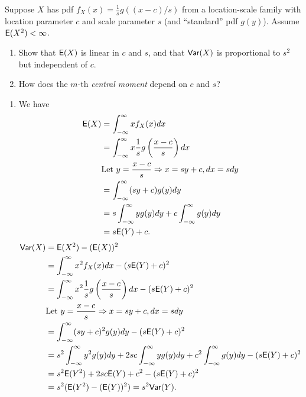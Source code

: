 \documentclass[12pt]{article}
\newcommand{\E}{{\sf E}}
\newcommand{\Var}{{\sf Var}}
\newenvironment{problem}[2][Problem]{\begin{trivlist}
\item[\hskip \labelsep {\bfseries #1}\hskip \labelsep {\bfseries #2.}]}
{\end{trivlist}}
\begin{document}
\begin{problem}{5}
  Suppose $X$ has pdf $f_X(x) = \frac1s g((x-c)/s)$ from a location-scale
  family with location parameter $c$ and scale parameter $s$
  (and ``standard'' pdf $g(y)$). Assume $\E(X^2) < \infty$.
  \begin{enumerate}
    \item Show that $\E(X)$ is linear in $c$ and $s$, and 
    that $\Var(X)$ is proportional to $s^2$ but independent of $c$.
    \item How does the $m$-th \textit{central moment} 
    depend on $c$ and $s$?
  \end{enumerate}

  \begin{enumerate}
    \item We have
    \[
      \begin{aligned}
        \E(X) &= \int_{-\infty}^{\infty} x f_X(x) dx \\
        &= \int_{-\infty}^{\infty} x \frac1s g\left(\frac{x-c}{s}\right) dx \\
        &\text{Let } y = \frac{x-c}{s} \Rightarrow x = sy + c, dx = s dy\\
        &= \int_{-\infty}^{\infty} (sy + c) g(y) dy \\
        &= s \int_{-\infty}^{\infty} y g(y) dy + 
        c \int_{-\infty}^{\infty} g(y) dy \\
        &= s\E(Y) + c.
      \end{aligned}
    \]
    \[
      \begin{aligned}
        \Var(X) &= \E(X^2) - (\E(X))^2 \\
        &= \int_{-\infty}^{\infty} x^2 f_X(x) dx - (s\E(Y) + c)^2 \\
        &= \int_{-\infty}^{\infty} x^2 \frac1s g\left(\frac{x-c}{s}\right) dx - 
        (s\E(Y) + c)^2 \\
        &\text{Let } y = \frac{x-c}{s} \Rightarrow x = sy + c, dx = s dy\\
        &= \int_{-\infty}^{\infty} (sy + c)^2 g(y) dy - (s\E(Y) + c)^2 \\
        &= s^2 \int_{-\infty}^{\infty} y^2 g(y) dy + 
        2sc \int_{-\infty}^{\infty} y g(y) dy + 
        c^2 \int_{-\infty}^{\infty} g(y) dy - (s\E(Y) + c)^2 \\
        &= s^2 \E(Y^2) + 2sc\E(Y) + c^2 - (s\E(Y) + c)^2 \\
        &= s^2 (\E(Y^2) - (\E(Y))^2) = s^2 \Var(Y).
      \end{aligned}
    \]

\end{enumerate}
\end{problem}
\end{document}
